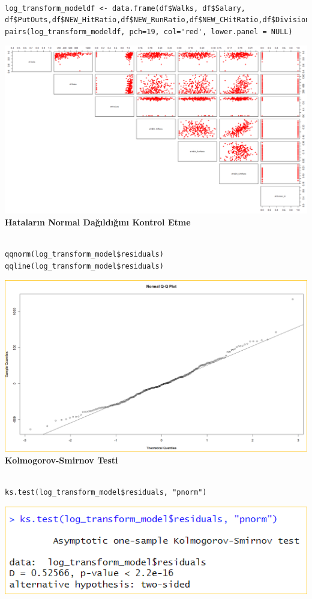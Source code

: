 \documentclass[
]{article}
\begin{document}
\begin{verbatim}

log_transform_modeldf <- data.frame(df$Walks, df$Salary, df$PutOuts,df$NEW_HitRatio,df$NEW_RunRatio,df$NEW_CHitRatio,df$Division_W)
pairs(log_transform_modeldf, pch=19, col='red', lower.panel = NULL)
\end{verbatim}

\includegraphics{Picture7.png}\textbf{Hataların Normal Dağıldığını
Kontrol Etme}

\begin{verbatim}

qqnorm(log_transform_model$residuals)
qqline(log_transform_model$residuals)
\end{verbatim}

\includegraphics{Picture8.png}\textbf{Kolmogorov-Smirnov Testi}

\begin{verbatim}

ks.test(log_transform_model$residuals, "pnorm")
\end{verbatim}

\includegraphics[width=7.15625in,height=\textheight]{Picture9.png}
\end{document}
